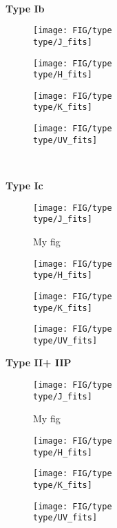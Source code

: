 
\ 

\renewcommand{\type}{Ib}
\textbf{Type \type}
\begin{figure}[H]
\texttt{[image: FIG/type\\type/J\_fits]}
\end{figure}
\begin{figure}[H]
\centering
\texttt{[image: FIG/type\\type/H\_fits]}
\end{figure}
\begin{figure}[H]
\centering
\texttt{[image: FIG/type\\type/K\_fits]}
\end{figure}
\begin{figure}[H]
\centering
\texttt{[image: FIG/type\\type/UV\_fits]}
\end{figure}

\pagebreak
\renewcommand{\type}{Ic}

\

\textbf{Type \type}
\begin{figure}[H]
\texttt{[image: FIG/type\\type/J\_fits]}
\caption{\label{fig:FIG/typeIb/J_fits} My fig}
\end{figure}
\begin{figure}[H]
\centering
\texttt{[image: FIG/type\\type/H\_fits]}
\end{figure}
\begin{figure}[H]
\centering
\texttt{[image: FIG/type\\type/K\_fits]}
\end{figure}
\begin{figure}[H]
\centering
\texttt{[image: FIG/type\\type/UV\_fits]}
\end{figure}
\pagebreak
\renewcommand{\type}{II}
\textbf{Type \type + IIP}
\begin{figure}[H]
\texttt{[image: FIG/type\\type/J\_fits]}
\caption{\label{fig:FIG/typeIb/J_fits} My fig}
\end{figure}
\begin{figure}[H]
\centering
\texttt{[image: FIG/type\\type/H\_fits]}
\end{figure}
\begin{figure}[H]
\centering
\texttt{[image: FIG/type\\type/K\_fits]}
\end{figure}
\begin{figure}[H]
\centering
\texttt{[image: FIG/type\\type/UV\_fits]}
\end{figure}
\pagebreak

